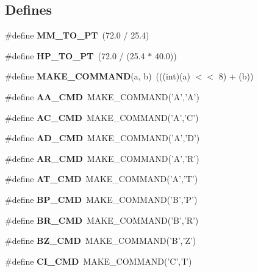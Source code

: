 \subsection*{Defines}
\begin{CompactItemize}
\item 
\#define \textbf{MM\_\-TO\_\-PT}~(72.0 / 25.4)\label{hpgsreader_8h_0819501dbaaaafbee07073554f276b65}

\item 
\#define \textbf{HP\_\-TO\_\-PT}~(72.0 / (25.4 $\ast$ 40.0))\label{hpgsreader_8h_63d937b5a3ae35e7f6a6e73b323d4f49}

\item 
\#define \textbf{MAKE\_\-COMMAND}(a, b)~(((int)(a) $<$$<$ 8) + (b))\label{hpgsreader_8h_91791e99c63cc542fdbaad05b341aff9}

\item 
\#define \textbf{AA\_\-CMD}~MAKE\_\-COMMAND('A','A')\label{hpgsreader_8h_b6b399d9cb7fdd99b09e8546f89ab737}

\item 
\#define \textbf{AC\_\-CMD}~MAKE\_\-COMMAND('A','C')\label{hpgsreader_8h_f4269d5f9a7846aed0b3428c682ea73b}

\item 
\#define \textbf{AD\_\-CMD}~MAKE\_\-COMMAND('A','D')\label{hpgsreader_8h_23e3ee2da83f429b7f3087d3ff8506b8}

\item 
\#define \textbf{AR\_\-CMD}~MAKE\_\-COMMAND('A','R')\label{hpgsreader_8h_15ed5c6b0904db067dd812547e9323f3}

\item 
\#define \textbf{AT\_\-CMD}~MAKE\_\-COMMAND('A','T')\label{hpgsreader_8h_5209e58cb4b467793fa1f2343afad77a}

\item 
\#define \textbf{BP\_\-CMD}~MAKE\_\-COMMAND('B','P')\label{hpgsreader_8h_4ffb85aa406671daafc5fff662e7aa76}

\item 
\#define \textbf{BR\_\-CMD}~MAKE\_\-COMMAND('B','R')\label{hpgsreader_8h_501f74bb295f6c7f7838f9775824c032}

\item 
\#define \textbf{BZ\_\-CMD}~MAKE\_\-COMMAND('B','Z')\label{hpgsreader_8h_59cffa12dba6d8af2c830f2e28982b91}

\item 
\#define \textbf{CI\_\-CMD}~MAKE\_\-COMMAND('C','I')\label{hpgsreader_8h_e286c7001d99f82c8fad55006953fe2a}


\end{CompactItemize}
